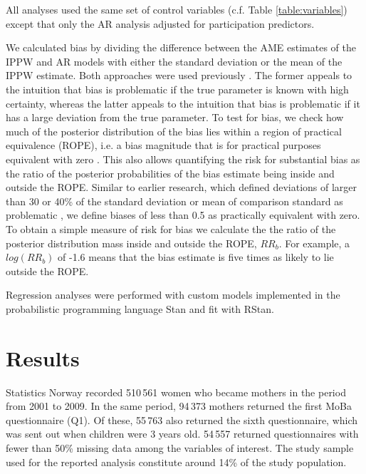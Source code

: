 \documentclass[12pt]{article}
\begin{document}
All analyses used the same set of control variables (c.f. Table \ref{table:variables}) except that only the AR analysis adjusted for participation predictors.

We calculated bias by dividing the difference between the AME estimates of the IPPW and AR models with either the standard deviation or the mean of the IPPW estimate. Both approaches were used previously \cite{Stuart2010-cj,Nilsen2009-ci}. The former appeals to the intuition that bias is problematic if the true parameter is known with high certainty, whereas the latter appeals to the intuition that bias is problematic if it has a large deviation from the true parameter. To test for bias, we check how much of the posterior distribution of the bias lies within a region of practical equivalence (ROPE), i.e. a bias magnitude that is for practical purposes equivalent with zero \cite{Kruschke2010-zi, Mascha2011-um}. This also allows quantifying the risk for substantial bias as the ratio of the posterior probabilities of the bias estimate being inside and outside the ROPE. Similar to earlier research, which defined deviations of larger than 30 or 40\% of the standard deviation or mean of comparison standard as problematic \cite{Stuart2010-cj,Nohr2006-uf}, we define biases of less than 0.5 as practically equivalent with zero. To obtain a simple measure of risk for bias we calculate the the ratio of the posterior distribution mass inside and outside the ROPE, $RR_b$. For example, a $log(RR_b)$ of -1.6 means that the bias estimate is five times as likely to lie outside the ROPE.

Regression analyses were performed with custom models implemented in the probabilistic programming language Stan \cite{Stan_Development_Team2017-lp} and fit with RStan\cite{Stan_Development_Team2017-lp}.

\section{Results}

Statistics Norway recorded 510\,561 women who became mothers in the period from 2001 to 2009. In the same period, 94\,373 mothers returned the first MoBa questionnaire (Q1). Of these, 55\,763 also returned the sixth questionnaire,  which was sent out when  children were 3 years old. 54\,557 returned questionnaires with fewer than 50\% missing data among the variables of interest. The study sample used for the reported analysis constitute around 14\% of the study population.
\end{document}
